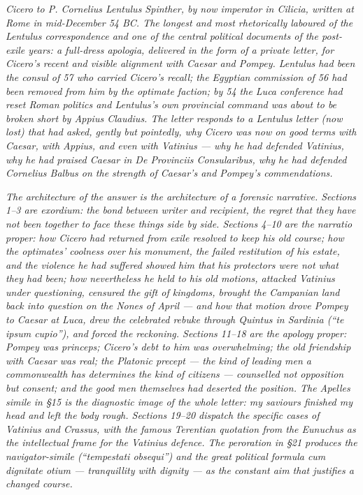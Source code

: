 
\textit{Cicero to P. Cornelius Lentulus Spinther, by now
\textit{imperator} in Cilicia, written at Rome in mid-December
54 BC. The longest and most rhetorically laboured of the
Lentulus correspondence and one of the central political
documents of the post-exile years: a full-dress apologia,
delivered in the form of a private letter, for Cicero's
recent and visible alignment with Caesar and Pompey. Lentulus
had been the consul of 57 who carried Cicero's recall; the
Egyptian commission of 56 had been removed from him by the
optimate faction; by 54 the Luca conference had reset Roman
politics and Lentulus's own provincial command was about to be
broken short by Appius Claudius. The letter responds to a
Lentulus letter (now lost) that had asked, gently but
pointedly, why Cicero was now on good terms with Caesar, with
Appius, and even with Vatinius --- why he had defended
Vatinius, why he had praised Caesar in \textit{De Provinciis
Consularibus}, why he had defended Cornelius Balbus on the
strength of Caesar's and Pompey's commendations.}

\textit{The architecture of the answer is the architecture of
a forensic narrative. Sections 1--3 are exordium: the bond
between writer and recipient, the regret that they have not
been together to face these things side by side. Sections
4--10 are the \textit{narratio} proper: how Cicero had returned
from exile resolved to keep his old course; how the
optimates' coolness over his monument, the failed restitution
of his estate, and the violence he had suffered showed him
that his protectors were not what they had been; how
nevertheless he held to his old motions, attacked Vatinius
under questioning, censured the gift of kingdoms, brought the
Campanian land back into question on the Nones of April ---
and how that motion drove Pompey to Caesar at Luca, drew the
celebrated rebuke through Quintus in Sardinia (``\textit{te
ipsum cupio}''), and forced the reckoning. Sections 11--18
are the apology proper: Pompey was \textit{princeps}; Cicero's
debt to him was overwhelming; the old friendship with Caesar
was real; the Platonic precept --- the kind of leading men a
commonwealth has determines the kind of citizens --- counselled
not opposition but consent; and the good men themselves had
deserted the position. The Apelles simile in \S 15 is the
diagnostic image of the whole letter: my saviours finished my
head and left the body rough. Sections 19--20 dispatch the
specific cases of Vatinius and Crassus, with the famous
Terentian quotation from the \textit{Eunuchus} as the
intellectual frame for the Vatinius defence. The peroration
in \S 21 produces the navigator-simile (``\textit{tempestati
obsequi}'') and the great political formula \textit{cum
dignitate otium} --- tranquillity with dignity --- as the
constant aim that justifies a changed course.}

